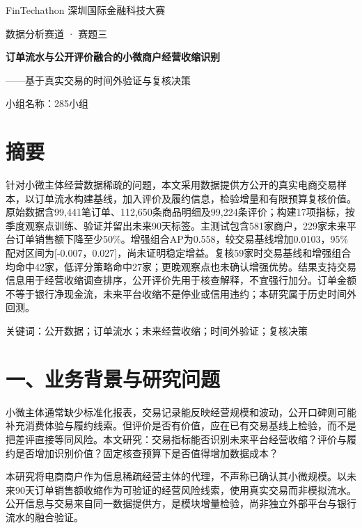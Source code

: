\documentclass[a4paper,10pt]{article}
\renewcommand{\normalsize}{\fontsize{10.5bp}{15.75bp}\selectfont}
\begin{document}
\begin{titlepage}
\centering
\vspace*{30mm}
{\fontsize{15pt}{23pt} FinTechathon 深圳国际金融科技大赛\par}
\vspace{5mm}
{\fontsize{12pt}{18pt}\selectfont 数据分析赛道 · 赛题三\par}
\vspace{26mm}
{\fontsize{20pt}{30pt}\selectfont\bfseries 订单流水与公开评价融合的小微商户经营收缩识别\par}
\vspace{5mm}
{\fontsize{13pt}{21pt}\selectfont ——基于真实交易的时间外验证与复核决策\par}
\vspace{30mm}
{\fontsize{14pt}{21pt}\selectfont 小组名称：285小组\par}
\end{titlepage}
\setcounter{page}{1}
\normalsize
\section*{摘要}
针对小微主体经营数据稀疏的问题，本文采用数据提供方公开的真实电商交易样本，以订单流水构建基线，加入评价及履约信息，检验增量和有限预算复核价值。原始数据含99,441笔订单、112,650条商品明细及99,224条评价；构建17项指标，按季度观察点训练、验证并留出未来90天标签。主测试包含581家商户，229家未来平台订单销售额下降至少50\%。增强组合AP为0.558，较交易基线增加0.0103，95\%配对区间为[-0.007，0.027]，尚未证明稳定增益。复核59家时交易基线和增强组合均命中42家，低评分策略命中27家；更晚观察点也未确认增强优势。结果支持交易信息用于经营收缩调查排序，公开评价先用于核查解释，不宜强行加分。订单金额不等于银行净现金流，未来平台收缩不是停业或信用违约；本研究属于历史时间外回测。

关键词：公开数据；订单流水；未来经营收缩；时间外验证；复核决策

\section*{一、业务背景与研究问题}
小微主体通常缺少标准化报表，交易记录能反映经营规模和波动，公开口碑则可能补充消费体验与履约线索。但评价是否有价值，应在已有交易基线上检验，而不是把差评直接等同风险。本文研究：交易指标能否识别未来平台经营收缩？评价与履约是否增加识别价值？固定核查预算下是否值得增加数据成本？

本研究将电商商户作为信息稀疏经营主体的代理，不声称已确认其小微规模。以未来90天订单销售额收缩作为可验证的经营风险线索，使用真实交易而非模拟流水。公开信息与交易来自同一数据提供方，是模块增量检验，尚非独立外部平台与银行流水的融合验证。
\end{document}
